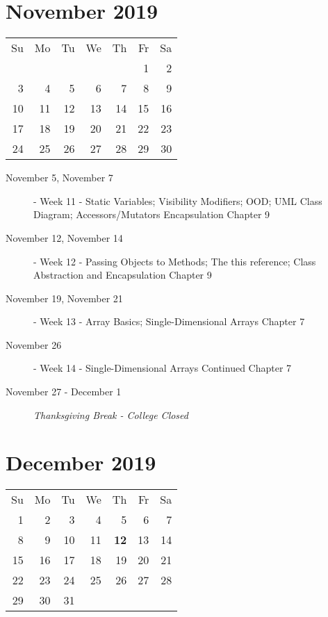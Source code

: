 \documentclass{article}
\begin{document}
\hrulefill

\section*{November 2019}
\begin{tabular}{rrrrrrr}
Su & Mo & Tu & We & Th & Fr & Sa\\
   &    &    &    &    &  1 &  2\\
 3 &  4 &  5 &  6 &  7 &  8 &  9\\
10 & 11 & 12 & 13 & 14 & 15 & 16\\
17 & 18 & 19 & 20 & 21 & 22 & 23\\
24 & 25 & 26 & 27 & 28 & 29 & 30\\
\end{tabular}

\begin{description}
    \item[November 5, November 7] - Week 11 - Static Variables;
        Visibility Modifiers; OOD; UML Class Diagram; Accessors/Mutators
        Encapsulation
        \newline Chapter 9
    \item[November 12, November 14] - Week 12 - Passing Objects to
        Methods; The this reference; Class Abstraction and Encapsulation
        \newline Chapter 9
    \item[November 19, November 21] - Week 13 - Array Basics;
        Single-Dimensional Arrays
        \newline Chapter 7
    \item[November 26] - Week 14 - Single-Dimensional Arrays Continued
        \newline Chapter 7
    \item[November 27 - December 1] {\em Thanksgiving Break - College Closed}
\end{description}

\hrulefill

\section*{December 2019}
\begin{tabular}{rrrrrrr}
Su & Mo & Tu & We & Th & Fr & Sa\\
 1 &  2 &  3 &  4 &  5 &  6 &  7\\
 8 &  9 & 10 & 11 & {\bf 12} & 13 & 14\\
15 & 16 & 17 & 18 & 19 & 20 & 21\\
22 & 23 & 24 & 25 & 26 & 27 & 28\\
29 & 30 & 31 &    &    &    &   \\
\end{tabular}
\end{document}
